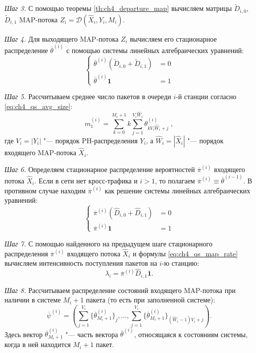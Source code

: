 \textit{Шаг 3.} С помощью теоремы \ref{th:ch4_departure_map} вычисляем матрицы $\tilde{D}_{i,0}$, $\tilde{D}_{i,1}$ MAP-потока $Z_i = \mathcal{D}(\hat{X}_i, Y_i, M_i)$.

\textit{Шаг 4.} Для выходящего MAP-потока $Z_i$ вычисляем его стационарное распределение $\overline{\theta}^{(i)}$ с помощью системы линейных алгебраических уравнений:
$$
  \begin{cases}
	  \overline{\theta}^{(i)}(\tilde{D}_{i,0} + \tilde{D}_{i,1}) &= 0\\
	  \overline{\theta}^{(i)} \mathbf{1} &= 1
  \end{cases}
$$

\textit{Шаг 5.} Рассчитываем среднее число пакетов в очереди $i$-й станции согласно \eqref{eq:ch4_qs_avg_size}:
$$
  m_1^{(i)} = \sum\limits_{k=0}^{M_i + 1} k \sum\limits_{j=1}^{V_i \hat{W}_i} \theta^{(i)}_{k V_i \hat{W}_i + j}\;,
$$
где $V_i = |Y_i|$ "--- порядок PH-распределения $Y_i$, а $\hat{W}_i = |\hat{X}_i|$ "--- порядок входящего MAP-потока $\hat{X}_i$.

\textit{Шаг 6.} Определяем стационарное распределение вероятностей $\overline{\pi}^{(i)}$ входящего потока $\hat{X}_i$. Если в сети нет кросс-трафика и $i > 1$, то полагаем $\overline{\pi}^{(i)} \equiv \overline{\theta}^{(i-1)}$. В противном случае находим $\overline{\pi}^{(i)}$ как решение системы линейных алгебраических уравнений:
$$
  \begin{cases}
	  \overline{\pi}^{(i)}(\hat{D}_{i,0} + \hat{D}_{i,1}) &= 0\\
	  \overline{\pi}^{(i)} \mathbf{1} &= 1
  \end{cases}
$$

\textit{Шаг 7.} С помощью найденного на предыдущем шаге стационарного распределения $\overline{\pi}^{(i)}$ входящего потока $\hat{X}_i$ и формулы \eqref{eq:ch4_qs_map_rate} вычисляем интенсивность поступления пакетов на $i$-ю станцию:
$$
  \lambda_i = \overline{\pi}^{(i)} \hat{D}_{i,1} \overline{\mathbf{1}}.
$$

\textit{Шаг 8.} Рассчитываем распределение состояний входящего MAP-потока при наличии в системе $M_i + 1$ пакета (то есть при заполненной системе):
$$
  \overline{\psi}^{(i)} = \left( 
  \sum\limits_{j=1}^{V_i} \{ \overline{\theta}^{(i)}_{M_i+1} \}_j, 
  \dots,  
  \sum\limits_{j=1}^{V_i} \{ \overline{\theta}^{(i)}_{M_i+1} \}_{(\hat{W}_i-1) V_i + j}
  \right).
$$
Здесь вектор $\overline{\theta}_{M_i+1}^{(i)}$ "--- часть вектора $\overline{\theta}^{(i)}$, относящаяся к состояниям системы, когда в ней находится $M_i + 1$ пакет.

